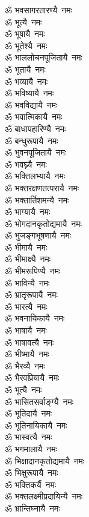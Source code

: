 \begin{flushleft}
\begin{multicols}{2}
ॐ भवसागरतारण्यै~नमः\\
ॐ भूत्यै~नमः\\
ॐ भूषायै~नमः\hfill{}\\
ॐ भूतेश्यै~नमः\\
ॐ भाललोचनपूजितायै~नमः\\
ॐ भूतायै~नमः\\
ॐ भव्यायै~नमः\\
ॐ भविष्यायै~नमः\\
ॐ भवविद्यायै~नमः\\
ॐ भवात्मिकायै~नमः\\
ॐ बाधापहारिण्यै~नमः\\
ॐ बन्धुरूपायै~नमः\\
ॐ भुवनपूजितायै~नमः\hfill{}\\
ॐ भवघ्न्यै~नमः\\
ॐ भक्तिलभ्यायै~नमः\\
ॐ भक्तरक्षणतत्परायै~नमः\\
ॐ भक्तार्तिशमन्यै~नमः\\
ॐ भाग्यायै~नमः\\
ॐ भोगदानकृतोद्यमायै~नमः\\
ॐ भुजङ्गभूषणायै~नमः\\
ॐ भीमायै~नमः\\
ॐ भीमाक्ष्यै~नमः\\
ॐ भीमरूपिण्यै~नमः\hfill{}\\
ॐ भाविन्यै~नमः\\
ॐ भ्रातृरूपायै~नमः\\
ॐ भारत्यै~नमः\\
ॐ भवनायिकायै~नमः\\
ॐ भाषायै~नमः\\
ॐ भाषावत्यै~नमः\\
ॐ भीष्मायै~नमः\\
ॐ भैरव्यै~नमः\\
ॐ भैरवप्रियायै~नमः\\
ॐ भूत्यै~नमः\hfill{}\\
ॐ भासितसर्वाङ्ग्यै~नमः\\
ॐ भूतिदायै~नमः\\
ॐ भूतिनायिकायै~नमः\\
ॐ भास्वत्यै~नमः\\
ॐ भगमालायै~नमः\\
ॐ भिक्षादानकृतोद्यमायै~नमः\\
ॐ भिक्षुरूपायै~नमः\\
ॐ भक्तिकर्यै~नमः\\
ॐ भक्तलक्ष्मीप्रदायिन्यै~नमः\\
ॐ भ्रान्तिघ्नायै~नमः\hfill{}\\

\end{multicols}
\end{flushleft}

